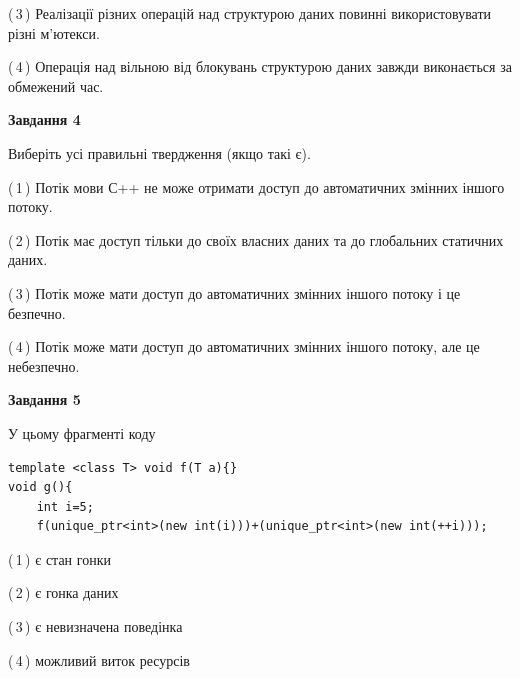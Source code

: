 \documentclass[12pt, ukrainian]{article}
\begin{document}
\begin {large}
{(\,3\,) Реалізації різних операцій над структурою даних повинні використовувати різні м’ютекси.%

(\,4\,) Операція над вільною від блокувань структурою даних завжди виконається за обмежений час.%



\begin{center}
\textbf{Завдання 4}
\end{center}
Виберіть усі правильні твердження (якщо такі є).\par


(\,1\,) Потік мови С++ не може отримати доступ до автоматичних змінних іншого потоку.%

(\,2\,) Потік має доступ тільки до своїх власних даних та до глобальних статичних даних.%

(\,3\,) Потік може мати доступ до автоматичних змінних іншого потоку і це безпечно.%

(\,4\,) Потік може мати доступ до автоматичних змінних іншого потоку, але це небезпечно.%



\begin{center}
\textbf{Завдання 5}
\end{center}
У цьому фрагменті коду
\begin{verbatim}
template <class T> void f(T a){}
void g(){
    int i=5;
    f(unique_ptr<int>(new int(i)))+(unique_ptr<int>(new int(++i)));
\end{verbatim}
(\,1\,) є стан гонки%

(\,2\,) є гонка даних%

(\,3\,) є невизначена поведінка%

(\,4\,) можливий виток ресурсів%


}
\end {large}
\end{document}
